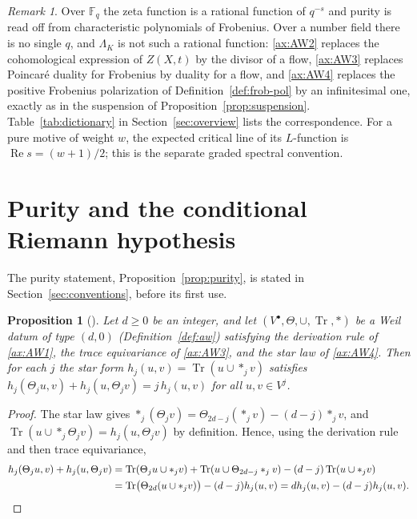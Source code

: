 \documentclass[11pt]{amsart}
\theoremstyle{plain}
\newtheorem{proposition}[theorem]{Proposition}
\theoremstyle{definition}
\theoremstyle{remark}
\newtheorem{remark}[theorem]{Remark}
\numberwithin{equation}{section}
\newcommand{\F}{\mathbb{F}}
\DeclareMathOperator{\Tr}{Tr}
\DeclareMathOperator{\Rea}{Re}
\renewcommand{\Re}{\Rea}
\begin{document}
\begin{remark}\label{rem:aw-analogy}
Over $\F_q$ the zeta function is a rational function of $q^{-s}$ and
purity is read off from characteristic polynomials of Frobenius. Over a
number field there is no single $q$, and $\Lambda_K$ is not such a
rational function: \ref{ax:AW2} replaces the cohomological expression
of $Z(X,t)$ by the divisor of a flow, \ref{ax:AW3} replaces Poincar\'e
duality for Frobenius by duality for a flow, and \ref{ax:AW4} replaces
the positive Frobenius polarization of Definition~\ref{def:frob-pol} by
an infinitesimal one, exactly as in the suspension of
Proposition~\ref{prop:suspension}. Table~\ref{tab:dictionary} in
Section~\ref{sec:overview} lists the correspondence. For a pure
motive of weight $w$, the expected critical line of its $L$-function
is $\Re s=(w+1)/2$; this is the separate graded spectral convention.
\end{remark}

\section{Purity and the conditional Riemann hypothesis}
\label{sec:purity}

The purity statement, Proposition~\ref{prop:purity}, is stated in
Section~\ref{sec:conventions}, before its first use.

\begin{proposition}[{\cite[p.~5]{Deninger2010HilbertPolya}}]%
\label{prop:polarization-identity}
Let $d\ge0$ be an integer, and let $(V^\bullet,\Theta,\cup,
\Tr,*)$ be a Weil datum of type $(d,0)$ (Definition~\ref{def:aw})
satisfying the derivation rule of \ref{ax:AW1}, the trace equivariance
of \ref{ax:AW3}, and the star law of \ref{ax:AW4}. Then for each $j$ the
star form $h_j(u,v)=\Tr(u\cup*_jv)$ satisfies
$h_j(\Theta_ju,v)+h_j(u,\Theta_jv)=j\,h_j(u,v)$ for all
$u,v\in V^j$.
\end{proposition}

\begin{proof}
The star law gives $*_j(\Theta_jv)=\Theta_{2d-j}(*_jv)-(d-j)*_jv$, and
$\Tr(u\cup*_j\Theta_jv)=h_j(u,\Theta_jv)$ by definition. Hence, using
the derivation rule and then trace equivariance,
\begin{align*}
h_j(\Theta_ju,v)+h_j(u,\Theta_jv)
&=\Tr(\Theta_ju\cup*_jv)+\Tr(u\cup\Theta_{2d-j}*_jv)
  -(d-j)\Tr(u\cup*_jv)\\
&=\Tr\bigl(\Theta_{2d}(u\cup*_jv)\bigr)-(d-j)h_j(u,v)
 =dh_j(u,v)-(d-j)h_j(u,v).\qedhere
\end{align*}
\end{proof}
\end{document}

